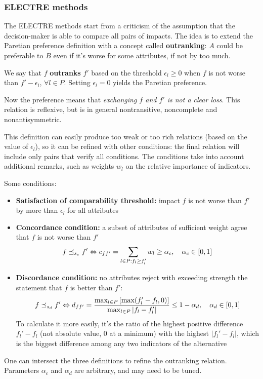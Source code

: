 \subsubsection{ELECTRE methods}

The ELECTRE methods start from a criticism of the assumption that the decision-maker is able to compare all pairs of impacts. The idea is to extend the Paretian preference definition with a concept called \textbf{outranking}: $A$ could be preferable to $B$ even if it's worse for some attributes, if not by too much.

We say that $f$ \textbf{outranks} $f'$ based on the threshold $\epsilon_l \geq 0$ when $f$ is not worse than $f' - \epsilon_l$, $\forall l \in P$. Setting $\epsilon_l = 0$ yields the Paretian preference. 

Now the preference means that \textit{exchanging $f$ and $f'$ is not a clear loss}. This relation is reflexive, but is in general nontransitive, noncomplete and nonantisymmetric.

This definition can easily produce too weak or too rich relations (based on the value of $\epsilon_l$), so it can be refined with other conditions: the final relation will include only pairs that verify all conditions. The conditions take into account additional remarks, such as weights $w_l$ on the relative importance of indicators.

Some conditions: 
\begin{itemize}
	\item \textbf{Satisfaction of comparability threshold:} impact $f$ is not worse than $f'$ by more than $\epsilon_l$ for all attributes
	
	\item \textbf{Concordance condition:} a subset of attributes of sufficient weight agree that $f$ is not worse than $f'$
	$$ f \preceq_{s_c} f' \Leftrightarrow c_{ff'} = \sum_{l \in P: f_l \geq f_l'} w_l \geq \alpha_c, \quad \alpha_c \in [0,1] $$
	
	\item \textbf{Discordance condition:} no attributes reject with exceeding strength the statement that $f$ is better than $f'$:
	$$ f \preceq_{s_d} f' \Leftrightarrow d_{ff'} = \frac{\max_{l \in P} \left[\max (f_l' - f_l, 0)\right]}{\max_{l \in P} |f_l - f_l'|} \leq 1 - \alpha_d, \quad \alpha_d \in [0,1] $$
    To calculate it more easily, it's the ratio of the highest positive difference $f_l' - f_l$ (not absolute value, 0 at a minimum) with the highest $|f_l' - f_l|$, which is the biggest difference among any two indicators of the alternative
\end{itemize}
One can intersect the three definitions to refine the outranking relation. Parameters $\alpha_c$  and $\alpha_d$ are arbitrary, and may need to be tuned.

